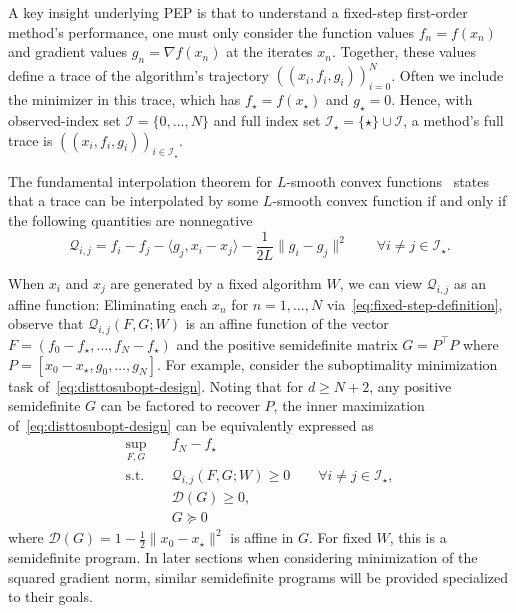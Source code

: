 \documentclass[11pt]{article}
\begin{document}
A key insight underlying PEP is that to understand a fixed-step first-order method's performance, one must only consider the function values $f_n=f(x_n)$ and gradient values $g_n=\nabla f(x_n)$ at the iterates $x_n$. Together, these values define a trace of the algorithm's trajectory $((x_i,f_i,g_i))_{i=0}^N$. Often we include the minimizer in this trace, which has $f_\star=f(x_\star)$ and $g_\star=0$. Hence, with observed-index set $\mathcal{I}=\{0,\dots,N\}$ and full index set $\mathcal{I}_\star=\{\star\}\cup\mathcal{I}$, a method's full trace is $((x_i,f_i,g_i))_{i\in\mathcal{I}_\star}$. 

The fundamental interpolation theorem for $L$-smooth convex functions~\cite{THG17} states that a trace can be interpolated by some $L$-smooth convex function if and only if the following quantities are nonnegative
\begin{equation*}
    \mathcal{Q}_{i,j} = f_i - f_j - \langle g_j, x_i-x_j\rangle - \frac{1}{2L}\|g_i-g_j\|^2 \qquad \forall i\neq j\in\mathcal{I}_\star.
\end{equation*}

When $x_i$ and $x_j$ are generated by a fixed algorithm $W$, we can view $\mathcal{Q}_{i,j}$ as an affine function: Eliminating each $x_n$ for $n=1,\dots,N$ via~\eqref{eq:fixed-step-definition}, observe that $\mathcal{Q}_{i,j}(F,G; W)$ is an affine function of the vector $F=(f_0-f_\star,\dots,f_N-f_\star)$ and the positive semidefinite matrix $G = P^\top P$ where $P=[x_0-x_\star,g_0,\dots,g_N]$. For example, consider the suboptimality minimization task of~\eqref{eq:disttosubopt-design}. Noting that for $d\geq N+2$, any positive semidefinite $G$ can be factored to recover $P$, the inner maximization of~\eqref{eq:disttosubopt-design} can be equivalently expressed as
\begin{equation} \label{eq:PEP-SDP}
\begin{aligned}
    \sup_{F,G}\quad & f_N-f_\star\\
    \mathrm{s.t.}\quad
    &\mathcal{Q}_{i,j}(F,G;W)\geq0
    \qquad \forall i\neq j\in\mathcal{I}_\star,\\
    &\mathcal{D}(G)\geq0,\\
    &G\succeq0
\end{aligned}
\end{equation}
where $\mathcal{D}(G) = 1 - \frac{1}{2}\|x_0-x_\star\|^2$ is affine in $G$. For fixed $W$, this is a semidefinite program. In later sections when considering minimization of the squared gradient norm, similar semidefinite programs will be provided specialized to their goals.
\end{document}
